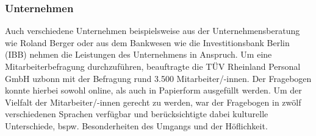 \subsubsection{Unternehmen }
Auch verschiedene Unternehmen beispielsweise aus der Unternehmensberatung wie Roland Berger oder aus dem Bankwesen wie die Investitionsbank Berlin (IBB) nehmen die Leistungen des Unternehmens in Anspruch. Um eine Mitarbeiterbefragung durchzuführen, beauftragte die TÜV Rheinland Personal GmbH uzbonn mit der Befragung rund 3.500 Mitarbeiter/-innen. Der Fragebogen konnte hierbei sowohl online, als auch in Papierform ausgefüllt werden. Um der Vielfalt der Mitarbeiter/-innen gerecht zu werden, war der Fragebogen in zwölf verschiedenen Sprachen verfügbar und berücksichtigte dabei kulturelle Unterschiede, bspw. Besonderheiten des Umgangs und der Höflichkeit. \\





